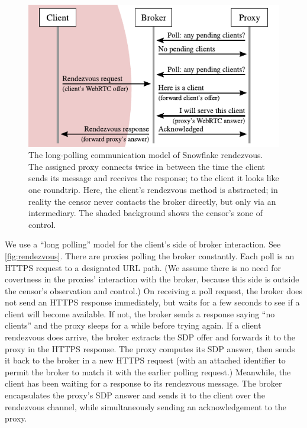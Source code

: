 \documentclass[letterpaper,twocolumn]{article}
\begin{document}
\begin{figure}
\includegraphics{figures/rendezvous/rendezvous}
\caption{
The long-polling communication model of Snowflake rendezvous.
The assigned proxy connects twice in between the time
the client sends its message and receives the response;
to the client it looks like one roundtrip.
Here, the client's rendezvous method is abstracted;
in reality the censor never contacts the broker directly,
but only via an intermediary.
The shaded background shows the censor's zone of control.
}
\label{fig:rendezvous}
\end{figure}

We use a ``long polling'' model for the client's side of broker interaction.
See \autoref{fig:rendezvous}.
There are proxies polling the broker constantly.
Each poll is an HTTPS request to a designated URL path.
(We assume there is no need for covertness
in the proxies' interaction with the broker,
because this side is outside the censor's observation and control.)
On receiving a poll request,
the broker does not send an HTTPS response immediately,
but waits for a few seconds to see if a client will become available.
If not, the broker sends a response saying ``no clients''
and the proxy sleeps for a while before trying again.
If a client rendezvous does arrive,
the broker extracts the SDP offer and forwards it to the proxy
in the HTTPS response.
The proxy computes its SDP answer,
then sends it back to the broker in a new HTTPS request
(with an attached identifier to permit the broker to match it
with the earlier polling request.)
Meanwhile, the client has been waiting for a response
to its rendezvous message.
The broker encapsulates the proxy's SDP answer
and sends it to the client over the rendezvous channel,
while simultaneously sending an acknowledgement to the proxy.
\end{document}
